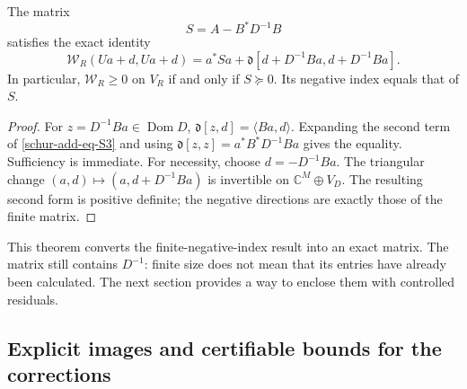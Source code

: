 \begin{theorem}
\label{schur-add-schur-exacto}
The matrix
\begin{equation}
S=A-B^*D^{-1}B
\label{schur-add-eq-S2}
\end{equation}
satisfies the exact identity
\begin{equation}
\boxed{\mathscr W_R(Ua+d,Ua+d)
=a^*Sa+
\mathfrak d[d+D^{-1}Ba,d+D^{-1}Ba].}
\label{schur-add-eq-S3}
\end{equation}
In particular, \(\mathscr W_R\geq0\) on \(V_R\) if and only if
\(S\succeq0\). Its negative index equals that of \(S\).
\end{theorem}
\begin{proof} For \(z=D^{-1}Ba\in\operatorname{Dom}D\),
\(\mathfrak d[z,d]=\langle Ba,d\rangle\). Expanding the second term
of \eqref{schur-add-eq-S3} and using \(\mathfrak d[z,z]=a^*B^*D^{-1}Ba\) gives the equality.
Sufficiency is immediate. For necessity, choose
\(d=-D^{-1}Ba\). The triangular change \((a,d)\mapsto(a,d+D^{-1}Ba)\)
is invertible on \(\mathbb C^M\oplus V_D\). The resulting second form
is positive definite; the negative directions are exactly those of
the finite matrix.
\end{proof}

This theorem converts the finite-negative-index result into an exact matrix. The matrix still contains \(D^{-1}\): finite size does not
mean that its entries have already been calculated. The next section
provides a way to enclose them with controlled residuals.

\subsection{Explicit images and certifiable bounds for the corrections}
\label{schur-add-sub-148}

